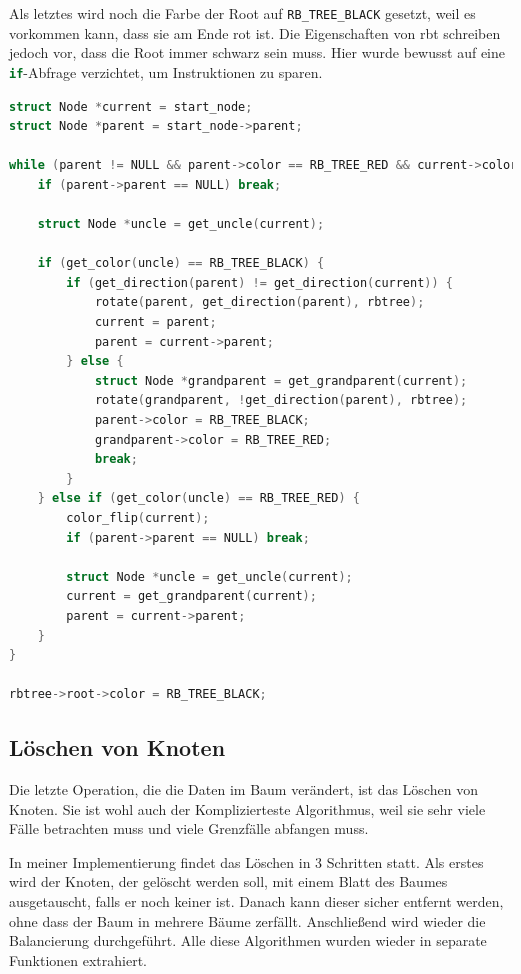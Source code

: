 \documentclass[11pt]{article}
\newcommand{\lstin}[1]{\lstinline[language=C]{#1}}
\begin{document}
Als letztes wird noch die Farbe der Root auf \lstin{RB_TREE_BLACK} gesetzt, weil es vorkommen kann,
dass sie am Ende rot ist. Die Eigenschaften von \gls{rbt} schreiben jedoch vor, dass die Root immer schwarz sein muss.
Hier wurde bewusst auf eine \lstin{if}-Abfrage verzichtet, um Instruktionen zu sparen.

\begin{lstlisting}[language=C]
struct Node *current = start_node;
struct Node *parent = start_node->parent;

while (parent != NULL && parent->color == RB_TREE_RED && current->color == RB_TREE_RED) {
    if (parent->parent == NULL) break;

    struct Node *uncle = get_uncle(current);

    if (get_color(uncle) == RB_TREE_BLACK) {
        if (get_direction(parent) != get_direction(current)) {
            rotate(parent, get_direction(parent), rbtree);
            current = parent;
            parent = current->parent;
        } else {
            struct Node *grandparent = get_grandparent(current);
            rotate(grandparent, !get_direction(parent), rbtree);
            parent->color = RB_TREE_BLACK;
            grandparent->color = RB_TREE_RED;
            break;
        }
    } else if (get_color(uncle) == RB_TREE_RED) {
        color_flip(current);
        if (parent->parent == NULL) break;

        struct Node *uncle = get_uncle(current);
        current = get_grandparent(current);
        parent = current->parent;
    }
}

rbtree->root->color = RB_TREE_BLACK;

\end{lstlisting}

\subsection{Löschen von Knoten}

Die letzte Operation, die die Daten im Baum verändert, ist das Löschen von Knoten.
Sie ist wohl auch der Komplizierteste Algorithmus, weil sie sehr viele Fälle betrachten
muss und viele Grenzfälle abfangen muss.

In meiner Implementierung findet das Löschen in 3 Schritten statt. Als erstes wird der Knoten, der gelöscht werden soll,
mit einem Blatt des Baumes ausgetauscht, falls er noch keiner ist. Danach kann dieser sicher entfernt werden, ohne dass der Baum
in mehrere Bäume zerfällt. Anschließend wird wieder die Balancierung durchgeführt.
Alle diese Algorithmen wurden wieder in separate Funktionen extrahiert.
\end{document}
